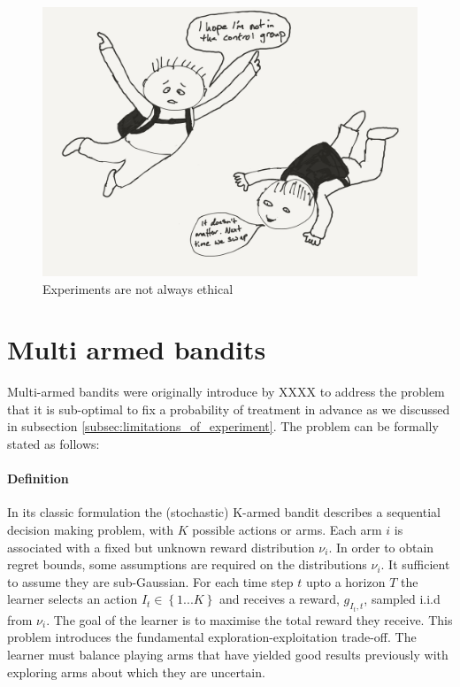 \documentclass[11pt,a4paper,oneside]{book}
\newcommand{\set}[1]{\left\{#1\right\}}
\theoremstyle{plain}
\theoremstyle{definition}
\begin{document}
\begin{figure}[h]
\begin{center}
\caption{Experiments are not always ethical}
\includegraphics[scale=.4]{double_blind_parashute_trial_cartoon.png}
\end{center}
\end{figure}

\section{Multi armed bandits}

Multi-armed bandits were originally introduce by XXXX to address the problem that it is sub-optimal to fix a probability of treatment in advance as we discussed in subsection \ref{subsec:limitations_of_experiment}. The problem can be formally stated as follows:

\paragraph*{Definition} 
In its classic formulation \cite{Robbins1952} the (stochastic) K-armed bandit describes a sequential decision making problem, with $K$ possible actions or arms. Each arm $i$ is associated with a fixed but unknown reward distribution $\nu_i$. In order to obtain regret bounds, some assumptions are required on the distributions $\nu_i$. It sufficient to assume they are sub-Gaussian.  For each time step $t$ upto a horizon $T$ the learner selects an action $I_t \in \set{1...K}$ and receives a reward, $g_{I_t,t}$, sampled i.i.d from $\nu_i$. The goal of the learner is to maximise the total reward they receive. This problem introduces the fundamental exploration-exploitation trade-off. The learner must balance playing arms that have yielded good results previously with exploring arms about which they are uncertain. 
\end{document}
